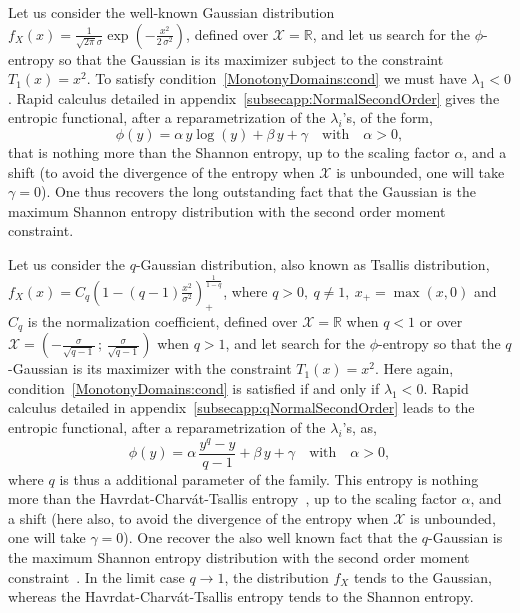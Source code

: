 \documentclass[entropy,article,submit,moreauthors,pdftex]{Definitions/mdpi}
\newcounter{GaussExample}%
\newcounter{qGaussExample}%
\newcommand{\SZ}[1]{{\color{blue} #1}}                                       %
\def\Rset{\mathbb{R}}%
\def\X{\mathcal{X}}%
\begin{document}
\begin{Example}\label{Gauss:ex}\setcounter{GaussExample}{\value{example}}
  Let   us   consider   the   well-known   Gaussian   distribution   $f_X(x)   =
  \frac{1}{\sqrt{2 \pi} \sigma} \exp\left( - \frac{x^2}{2 \, \sigma^2} \right)$,
  defined over $\X  = \Rset$, and let  us search for the  $\phi$-entropy so that
  the Gaussian  is its maximizer subject  to the constraint $T_1(x)  = x^2$.  To
  satisfy  condition~\ref{MonotonyDomains:cond} we  must have  $\lambda_1 <  0$.
  Rapid  calculus  \SZ{detailed  in  appendix~\ref{subsecapp:NormalSecondOrder}}
  gives the entropic functional, after a reparametrization of the $\lambda_i$'s,
  of the  form, $$\phi(y)  = \alpha \,  y \log(y)  + \beta \,  y +  \gamma \quad
  \mbox{with} \quad \alpha > 0,$$ that is nothing more than the Shannon entropy,
  up to the scaling factor $\alpha$, and a shift \SZ{(to avoid the divergence of
    the entropy when $\X$ is unbounded, one  will take $\gamma = 0$)}.  One thus
  recovers the  long outstanding fact that  the Gaussian is the  maximum Shannon
  entropy distribution with the second order moment constraint.
\end{Example}
%
\begin{Example}\label{qGauss:ex}\setcounter{qGaussExample}{\value{example}}
   Let  us  consider  the  $q$-Gaussian  distribution,  also  known  as  Tsallis
   distribution,   $f_X(x)  =   C_q  \left(   1  -   (q-1)  \frac{x^2}{\sigma^2}
   \right)_+^{\frac{1}{1-q}}$, where $q > 0, \: q \ne 1, \: x_+ = \max(x,0)$ and
   $C_q$ is the normalization coefficient, \SZ{defined over $\X = \Rset$ when $q
     <  1$   or  over  $\X  =   \left(  -  \frac{\sigma}{\sqrt{q-1}}  \,   ;  \,
     \frac{\sigma}{\sqrt{q-1}} \right) $  when $q > 1$}, and let  search for the
   $\phi$-entropy so that the $q$-Gaussian  is its maximizer with the constraint
   $T_1(x)   =  x^2$.    Here  again,   condition~\ref{MonotonyDomains:cond}  is
   satisfied if  and only if  $\lambda_1 <  0$.  Rapid calculus  \SZ{detailed in
     appendix~\ref{subsecapp:qNormalSecondOrder}}   leads    to   the   entropic
   functional, after a  reparametrization of the $\lambda_i$'s,  as, $$\phi(y) =
   \alpha \,  \frac{y^q-y}{q-1} + \beta  \, y  + \gamma \quad  \mbox{with} \quad
   \alpha  >  0,$$  \SZ{  where  $q$  is thus  a  additional  parameter  of  the
     family. This  entropy} is  nothing more than  the Havrdat-Charv\'at-Tsallis
   entropy~\cite{HavCha67,  Dar70, Tsa88,  CosHer03}, up  to the  scaling factor
   $\alpha$, and a shift \SZ{(here also,  to avoid the divergence of the entropy
     when $\X$ is unbounded, one will take $\gamma = 0$)}.  One recover the also
   well  known  fact  that  the  $q$-Gaussian is  the  maximum  Shannon  entropy
   distribution with the second order moment constraint~\cite{CosHer03}.  In the
   limit case $q  \to 1$, the distribution $f_X$ tends  to the Gaussian, whereas
   the Havrdat-Charv\'at-Tsallis entropy tends to the Shannon entropy.
\end{Example}
\end{document}
